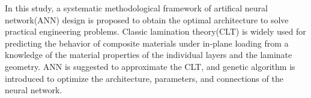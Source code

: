 In this study, a systematic methodological framework of artifical neural
network(ANN) design is proposed to obtain the optimal architecture to solve
practical engineering problems. Classic lamination theory(CLT) is widely used
for predicting the behavior of composite materials under in-plane loading from a
knowledge of the material properties of the individual layers and the laminate
geometry. ANN is suggested to approximate the CLT, and genetic algorithm is
introduced to optimize the architecture, parameters, and connections of the
neural network. 
